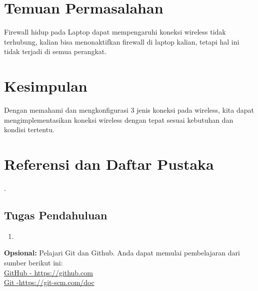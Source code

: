 \section{Temuan Permasalahan}
Firewall hidup pada Laptop dapat mempengaruhi koneksi wireless tidak terhubung, kalian
bisa menonaktifkan firewall di laptop kalian, tetapi hal ini tidak terjadi di semua perangkat.

\section{Kesimpulan}
Dengan memahami dan mengkonfigurasi 3 jenis koneksi pada wireless, kita dapat
mengimplementasikan koneksi wireless dengan tepat sesuai kebutuhan dan kondisi tertentu.

\section{Referensi dan Daftar Pustaka}
\cite{Newton1687}.

\subsection{Tugas Pendahuluan}
\begin{enumerate}
	\item 
\end{enumerate}


\begin{center}
	\colorbox{cyan!30}{\parbox{0.8\linewidth}{\textbf{Opsional:} Pelajari Git dan Github. Anda dapat memulai pembelajaran dari sumber berikut ini: \\ \href{https://github.com}{GitHub - https://github.com} \\ \href{https://git-scm.com/doc}{Git -https://git-scm.com/doc}}}
\end{center}